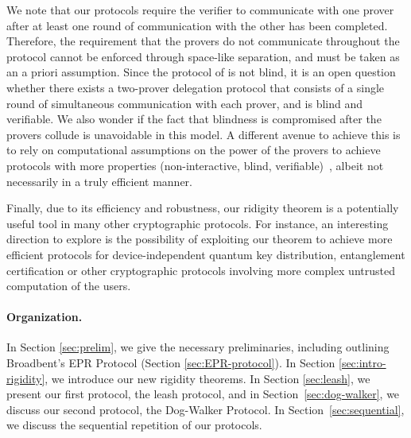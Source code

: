 We note that our protocols require the verifier to communicate with one
prover after at least one round of communication with the other has been
completed. Therefore, the requirement that the provers do not
communicate throughout the protocol cannot be enforced through space-like
separation, and must be taken as an a priori assumption.
Since the protocol of \cite{Grilo17} is not blind, it is an open question
whether there exists a two-prover
delegation protocol that consists of a single round of simultaneous
communication with each prover, and is blind and verifiable. 
We also wonder if the fact that blindness is compromised after the provers
collude is unavoidable in this model.
A different
avenue to achieve this is to rely on computational assumptions on the power of
the provers to achieve protocols with more properties (non-interactive, blind,
verifiable)~\cite{dulek16,alagic2017quantum,mahadev2017,mahadev2018}, albeit not
necessarily in a truly efficient manner.

Finally, due to its efficiency and robustness, our ridigity theorem is a
potentially useful tool in many other cryptographic protocols. For instance, an
interesting direction to explore is the possibility of exploiting our theorem to
achieve more efficient protocols for device-independent quantum key
distribution, entanglement certification or other cryptographic protocols
involving more complex untrusted computation of the users.




\paragraph{Organization.}
In Section \ref{sec:prelim}, we give the necessary preliminaries, including
outlining Broadbent's EPR Protocol (Section \ref{sec:EPR-protocol}). In Section
\ref{sec:intro-rigidity}, we introduce our new rigidity theorems. In Section
\ref{sec:leash}, we present our first protocol, the leash protocol, and in
Section~\ref{sec:dog-walker}, we discuss our second protocol, the
Dog-Walker Protocol. In Section~\ref{sec:sequential}, we discuss the sequential repetition of our protocols.



